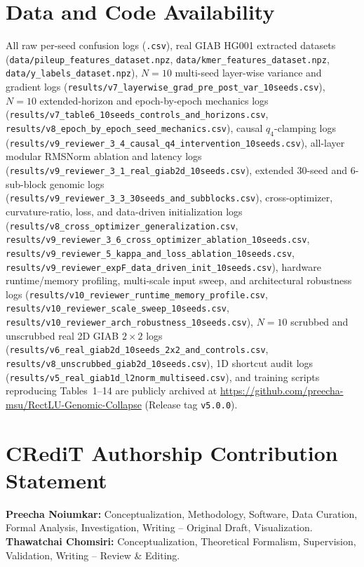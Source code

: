 \documentclass[11pt, a4paper]{article}
\begin{document}
\section*{Data and Code Availability}
All raw per-seed confusion logs (\texttt{.csv}), real GIAB HG001 extracted datasets (\texttt{data/pileup\_features\_dataset.npz}, \texttt{data/kmer\_features\_dataset.npz}, \texttt{data/y\_labels\_dataset.npz}), $N = 10$ multi-seed layer-wise variance and gradient logs (\texttt{results/v7\_layerwise\_grad\_pre\_post\_var\_10seeds.csv}), $N = 10$ extended-horizon and epoch-by-epoch mechanics logs (\texttt{results/v7\_table6\_10seeds\_controls\_and\_horizons.csv}, \texttt{results/v8\_epoch\_by\_epoch\_seed\_mechanics.csv}), causal $q_4$-clamping logs (\texttt{results/v9\_reviewer\_3\_4\_causal\_q4\_intervention\_10seeds.csv}), all-layer modular RMSNorm ablation and latency logs (\texttt{results/v9\_reviewer\_3\_1\_real\_giab2d\_10seeds.csv}), extended 30-seed and 6-sub-block genomic logs (\texttt{results/v9\_reviewer\_3\_3\_30seeds\_and\_subblocks.csv}), cross-optimizer, curvature-ratio, loss, and data-driven initialization logs (\texttt{results/v8\_cross\_optimizer\_generalization.csv}, \texttt{results/v9\_reviewer\_3\_6\_cross\_optimizer\_ablation\_10seeds.csv}, \texttt{results/v9\_reviewer\_5\_kappa\_and\_loss\_ablation\_10seeds.csv}, \texttt{results/v9\_reviewer\_expF\_data\_driven\_init\_10seeds.csv}), hardware runtime/memory profiling, multi-scale input sweep, and architectural robustness logs (\texttt{results/v10\_reviewer\_runtime\_memory\_profile.csv}, \texttt{results/v10\_reviewer\_scale\_sweep\_10seeds.csv}, \texttt{results/v10\_reviewer\_arch\_robustness\_10seeds.csv}), $N = 10$ scrubbed and unscrubbed real 2D GIAB $2 \times 2$ logs (\texttt{results/v6\_real\_giab2d\_10seeds\_2x2\_and\_controls.csv}, \texttt{results/v8\_unscrubbed\_giab2d\_10seeds.csv}), 1D shortcut audit logs (\texttt{results/v5\_real\_giab1d\_l2norm\_multiseed.csv}), and training scripts reproducing Tables~1--14 are publicly archived at \url{https://github.com/preecha-msu/RectLU-Genomic-Collapse} (Release tag \texttt{v5.0.0}).

\section*{CRediT Authorship Contribution Statement}
\textbf{Preecha Noiumkar:} Conceptualization, Methodology, Software, Data Curation, Formal Analysis, Investigation, Writing -- Original Draft, Visualization. \textbf{Thawatchai Chomsiri:} Conceptualization, Theoretical Formalism, Supervision, Validation, Writing -- Review \& Editing.
\end{document}
